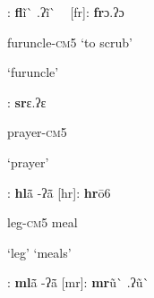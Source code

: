 \begin{styleindexi}
          [fl]:        \textbf{fl}ĩ\`{} .ʔĩ\`{} ~                                     [fr]:        \textbf{fr}ɔ.ʔɔ          
\end{styleindexi}

\begin{styleindexi}
                      furuncle-\textsc{cm}5                                    ‘to scrub’  
\end{styleindexi}

\begin{styleindexi}
                      ‘furuncle’
\end{styleindexi}

\begin{styleindexi}
           [sr]:        \textbf{sr}ɛ.ʔɛ                                           
\end{styleindexi}

\begin{styleindexi}
                      prayer-\textsc{cm}5                                         
\end{styleindexi}

\begin{styleindexi}
                      ‘prayer’                                             
\end{styleindexi}

\begin{styleindexi}
          [hl]:       \textbf{hl}ã\={} -ʔã\={}                                    [hr]:      \textbf{hr}ō6                                      
\end{styleindexi}

\begin{styleindexi}
                      leg-\textsc{cm}5                                            meal                                  
\end{styleindexi}

\begin{styleindexi}
                      ‘leg’                                                 ‘meals’                                
\end{styleindexi}

\begin{styleindexi}
          [ml]  :      \textbf{ml}ã\={} -ʔã\={}                                  [mr]:       \textbf{mr}ũ\`{} .ʔũ\`{}                                 
\end{styleindexi}

